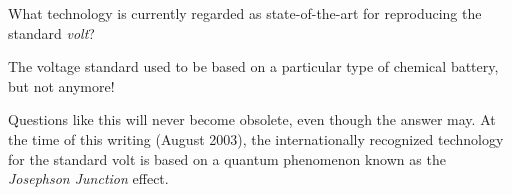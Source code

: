 

What technology is currently regarded as state-of-the-art for reproducing the standard {\it volt}?







The voltage standard used to be based on a particular type of chemical battery, but not anymore!







Questions like this will never become obsolete, even though the answer may.  At the time of this writing (August 2003), the internationally recognized technology for the standard volt is based on a quantum phenomenon known as the {\it Josephson Junction} effect.




